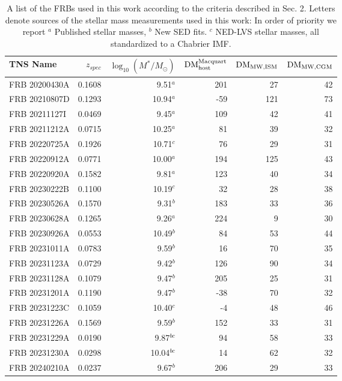 \begin{table}
\centering
\caption{A list of the FRBs used in this work according to the criteria described in Sec. 2. Letters denote sources of the stellar mass measurements used in this work: In order of priority we report $^{a}$ Published stellar masses, $^{b}$ New SED fits. $^{c}$ NED-LVS stellar masses, all standardized to a Chabrier IMF.}
\label{tab:sample}
\begin{tabular}{lrrrrr}
\toprule
TNS Name & $z_{spec}$ & $\log_{10}(M^*/M_\odot)$ & ${\rm DM}_\textrm{host}^\textrm{Macquart}$ & ${\rm DM}_\textrm{MW,ISM}$ & ${\rm DM}_\textrm{MW,CGM}$ \\
\midrule
FRB 20200430A & 0.1608 & 9.51$^{a}$ & 201 & 27 & 42 \\
FRB 20210807D & 0.1293 & 10.94$^{a}$ & -59 & 121 & 73 \\
FRB 20211127I & 0.0469 & 9.45$^{a}$ & 109 & 42 & 41 \\
FRB 20211212A & 0.0715 & 10.25$^{a}$ & 81 & 39 & 32 \\
FRB 20220725A & 0.1926 & 10.71$^{c}$ & 76 & 29 & 31 \\
FRB 20220912A & 0.0771 & 10.00$^{a}$ & 194 & 125 & 43 \\
FRB 20220920A & 0.1582 & 9.81$^{a}$ & 123 & 40 & 34 \\
FRB 20230222B & 0.1100 & 10.19$^{c}$ & 32 & 28 & 38 \\
FRB 20230526A & 0.1570 & 9.31$^{b}$ & 183 & 33 & 36 \\
FRB 20230628A & 0.1265 & 9.26$^{a}$ & 224 & 9 & 30 \\
FRB 20230926A & 0.0553 & 10.49$^{b}$ & 84 & 53 & 44 \\
FRB 20231011A & 0.0783 & 9.59$^{b}$ & 16 & 70 & 35 \\
FRB 20231123A & 0.0729 & 9.42$^{b}$ & 126 & 90 & 34 \\
FRB 20231128A & 0.1079 & 9.47$^{b}$ & 205 & 25 & 31 \\
FRB 20231201A & 0.1190 & 9.47$^{b}$ & -38 & 70 & 32 \\
FRB 20231223C & 0.1059 & 10.40$^{c}$ & -4 & 48 & 46 \\
FRB 20231226A & 0.1569 & 9.59$^{b}$ & 152 & 33 & 31 \\
FRB 20231229A & 0.0190 & 9.87$^{bc}$ & 94 & 58 & 33 \\
FRB 20231230A & 0.0298 & 10.04$^{bc}$ & 14 & 62 & 32 \\
FRB 20240210A & 0.0237 & 9.67$^{b}$ & 206 & 29 & 33 \\
\bottomrule
\end{tabular}
\end{table}
